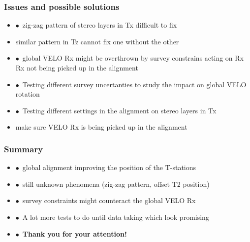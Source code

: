 \documentclass[aspectratio=1610, 12pt, xcolor=dvipsnames]{beamer}
\begin{document}
\begin{frame}\frametitle{Issues and possible solutions}
  \begin{itemize}
    \setlength\itemsep{0em}
    \item $\bullet$\, zig-zag pattern of stereo layers in Tx difficult to fix
    \item \to similar pattern in Tz \to cannot fix one without the other
    \item $\bullet$\, global VELO Rx might be overthrown by survey constrains acting on Rx \to Rx not being picked up in the alignment
    \item $\bullet$\, Testing different survey uncertanties to study the impact on global VELO rotation
    \item $\bullet$\, Testing different settings in the alignment on stereo layers in Tx
    \item make sure VELO Rx is being picked up in the alignment  \end{itemize}
\end{frame}


\begin{frame}\frametitle{Summary}
  \begin{itemize}
    \setlength\itemsep{0em}
    \item $\bullet$\, global alignment improving the position of the T-stations
    \item $\bullet$\, still unknown phenomena (zig-zag pattern, offset T2 position)
    \item $\bullet$\, survey constraints might counteract the global VELO Rx
    \item $\bullet$\, A lot more tests to do until data taking which look promising
    \item $\bullet$\, \textbf{Thank you for your attention!}
  \end{itemize}
\end{frame}

%   
\end{document}
